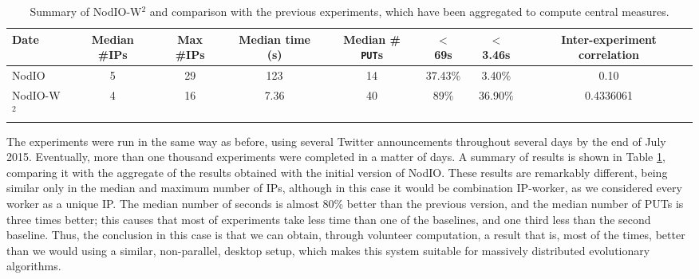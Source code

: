 \documentclass[journal,onecolumn]{IEEEtran}
\begin{document}
%
\begin{table}[!htb]
\caption{Summary of {\sf NodIO-W$^2$} and comparison with the previous
  experiments, which have been aggregated to compute central measures. \label{tab:summary:ww}}
\begin{center}
\begin{tabular}{l|ccccccc}
\hline
Date & Median \#IPs & Max \#IPs & Median time (s) & Median \#{\tt
  PUT}s & $<$ 69s & $<$ 3.46s & Inter-experiment correlation\\
\hline
{\sf NodIO} & 5 & 29 & 123 & 14 & 37.43\% & 3.40\% & 0.10 \\
{\sf NodIO-W$^2$} & 4  & 16 & 7.36 & 40 & 89\% & 36.90\% & 0.4336061 \\
\hline
\end{tabular}
\end{center}
\end{table}
%

The experiments were run in the same way as before, using several
Twitter announcements throughout several days by the end of July
2015. Eventually, more than one thousand experiments were completed in
a matter of days. A summary of results is shown in Table
\ref{tab:summary:ww}, comparing it with the aggregate of the results
obtained with the initial version of {\sf NodIO}. These results are
remarkably different, being similar only in the median and maximum
number of IPs, although in this case it would be combination
IP-worker, as we considered every worker as a unique IP. The median
number of seconds is almost 80\% better than the previous version, and
the median number of PUTs is three times better; this causes that most
of experiments take less time than one of the baselines, and one third
less than the second baseline. Thus, the conclusion in this case is
that we can obtain, through volunteer computation, a result that is,
most of the times, better than we would using a similar, non-parallel,
desktop setup, which makes this system suitable for massively
distributed evolutionary algorithms.

\end{document}
